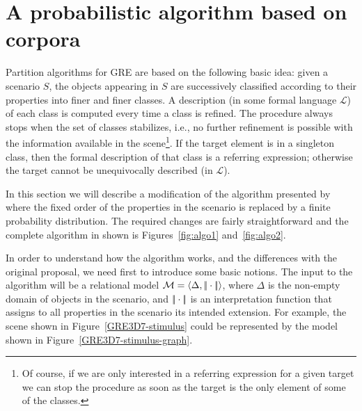 \section{A probabilistic algorithm based on corpora} \label{sec:algorithm}

Partition algorithms for GRE are based on the following basic idea: given a 
scenario $S$, the objects appearing in $S$ are successively classified according
to their properties into finer and finer classes. A description (in some formal language $\mathcal{L}$) of each 
class is computed every time a class is refined.   The procedure always stops when the 
set of classes stabilizes, i.e., no further refinement is possible with the information 
available in the scene\footnote{Of course, if we are only interested in a referring expression for 
a given target we can stop the procedure as soon as the target is the only element of some of the classes.}.  If the target element is in a singleton class, then 
the formal description of that class is a referring expression; otherwise the 
target cannot be unequivocally described (in $\mathcal{L}$).  

In this section we will describe a modification of the algorithm presented 
by~\cite{arec2:2008:Areces} where the fixed order of the properties in the 
scenario is replaced by a finite probability distribution.  The required changes
are fairly straightforward and the complete algorithm in shown is Figures~\ref{fig:algo1} and~\ref{fig:algo2}. 

In order to understand how the algorithm works, and the differences with the original proposal, we need first to introduce some 
basic notions.  The input to the algorithm will be a relational model $\mathcal{M} = \langle \Delta, |\!|\cdot|\!| \rangle$,
where $\Delta$ is the non-empty domain of objects in the scenario, and $|\!|\cdot|\!|$ is an 
interpretation function that assigns to all properties in the scenario its intended extension.  For example, 
the scene shown in Figure~\ref{GRE3D7-stimulus} could be represented by the model shown in Figure~\ref{GRE3D7-stimulus-graph}.

\newcommand{\nBlue}{\mathit{blue}\xspace}
\newcommand{\nGreen}{\mathit{green}\xspace}
\newcommand{\nSmall}{\mathit{small}\xspace}
\newcommand{\nBig}{\mathit{big}\xspace}
\newcommand{\nBall}{\mathit{ball}\xspace}
\newcommand{\nCube}{\mathit{cube}\xspace}
\newcommand{\nOntop}{\mathit{ontop}\xspace}
\newcommand{\nBelow}{\mathit{below}\xspace}
\newcommand{\nRightof}{\mathit{rightof}\xspace}
\newcommand{\nLeftof}{\mathit{leftof}\xspace}

